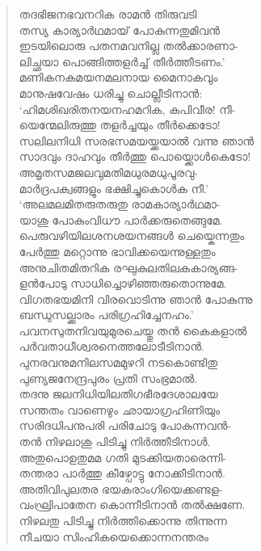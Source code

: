 \begin{verse}
തദഭിജനഭവനറിക രാമന്‍ തിരുവടി\\
തസ്യ കാര്യാര്‍ഥമായ് പോകുന്നതുമിവന്‍\\
ഇടയിലൊരു പതനമവനില്ല തല്‍ക്കാരണാ-\\
ലിച്ഛയാ പൊങ്ങിത്തളര്‍ച്ച് തീര്‍ത്തീടണം.’\\
മണികനകമയനമലനായ മൈനാകവും\\
മാനുഷവേഷം ധരിച്ചു ചൊല്ലീടിനാന്‍:\\
‘ഹിമശിഖരിതനയനഹമറിക, കപിവീര! നീ-\\
യെന്മേലിരുത്തു തളര്‍ച്ചയും തീര്‍ക്കെടോ!\\
സലിലനിധി സരഭസമയയ്ക്കയാല്‍ വന്നു ഞാന്‍\\
സാദവും ദാഹവും തീര്‍ത്തു പൊയ്ക്കൊള്‍കെടോ!\\
അമൃതസമജലവുമതിമധുരമധുപൂരവു-\\
മാര്‍ദ്രപക്വങ്ങളും ഭക്ഷിച്ചുകൊള്‍ക നീ.’\\
‘അലമലമിതരുതരുതു രാമകാര്യാര്‍ഥമാ-\\
യാശു പോകുംവിധൗ പാര്‍ക്കരുതെങ്ങുമേ.\\
പെരുവഴിയിലശനശയനങ്ങള്‍ ചെയ്കെന്നതും\\
പേര്‍ത്തു മറ്റൊന്നു ഭാവിക്കയെന്നുള്ളതും\\
അനുചിതമിതറിക രഘുകുലതിലകകാര്യങ്ങ-\\
ളന്‍പോടു സാധിച്ചൊഴിഞ്ഞരുതൊന്നുമേ.\\
വിഗതഭയമിനി വിരവൊടിന്നു ഞാന്‍ പോകുന്നു\\
ബന്ധുസല്ക്കാരം പരിഗ്രഹിച്ചേനഹം.’\\
പവനസുതനിവയുമുരചെയ്തു തന്‍ കൈകളാല്‍\\
പര്‍വതാധീശ്വരനെത്തലോടീടിനാന്‍.\\
പുനരവനുമനിലസമമുഴറി നടകൊണ്ടിതു\\
പുണ്യജനേന്ദ്രപുരം പ്രതി സംഭ്രമാല്‍.\\
തദനു ജലനിധിയിലതിഗഭീരദേശാലയേ\\
സന്തതം വാണെഴും ഛായാഗ്രഹിണിയും\\
സരിദധിപനുപരി പരിചോടു പോകുന്നവന്‍-\\
തന്‍ നിഴലാശു പിടിച്ചു നിര്‍ത്തീടിനാള്‍.\\
അതുപൊഉതുമമ ഗതി മുടക്കിയതാരെന്നി-\\
തന്തരാ പാര്‍ത്തു കീഴ്പോട്ടു നോക്കീടിനാന്‍.\\
അതിവിപുലതര ഭയകരാംഗിയെക്കണ്ടള-\\
വംഘ്രിപാതേന കൊന്നീടിനാന്‍ തല്‍ക്ഷണേ.\\
നിഴലതു പിടിച്ചു നിര്‍ത്തിക്കൊന്നു തിന്നുന്ന\\
നീചയാ സിംഹികയെക്കൊന്നനന്തരം\\

\end{verse}
